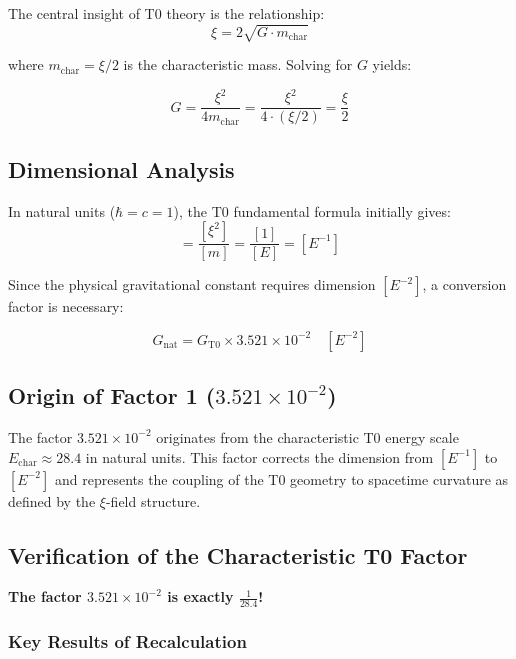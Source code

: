 	The central insight of T0 theory is the relationship:
	\begin{equation}
		\xi = 2\sqrt{G \cdot m_{\text{char}}}
	\end{equation}
	
	where $m_{\text{char}} = \xi/2$ is the characteristic mass. Solving for $G$ yields:
	
	\begin{equation}
		\boxed{G = \frac{\xi^2}{4m_{\text{char}}} = \frac{\xi^2}{4 \cdot (\xi/2)} = \frac{\xi}{2}}
	\end{equation}
	
	\subsection{Dimensional Analysis}
	
	In natural units ($\hbar = c = 1$), the T0 fundamental formula initially gives:
	\begin{equation}
		[G_{\text{T0}}] = \frac{[\xi^2]}{[m]} = \frac{[1]}{[E]} = [E^{-1}]
	\end{equation}
	
	Since the physical gravitational constant requires dimension $[E^{-2}]$, a conversion factor is necessary:
	
	\begin{equation}
		G_{\text{nat}} = G_{\text{T0}} \times 3.521 \times 10^{-2} \quad [E^{-2}]
	\end{equation}
	
	\subsection{Origin of Factor 1 ($3.521 \times 10^{-2}$)}
	
	The factor $3.521 \times 10^{-2}$ originates from the characteristic T0 energy scale $E_{\text{char}} \approx 28.4$ in natural units. This factor corrects the dimension from $[E^{-1}]$ to $[E^{-2}]$ and represents the coupling of the T0 geometry to spacetime curvature as defined by the $\xi$-field structure.
	
	\subsection{Verification of the Characteristic T0 Factor}
	
	\textbf{The factor $3.521 \times 10^{-2}$ is exactly $\frac{1}{28.4}$!}
	
	\subsubsection{Key Results of Recalculation}
	

